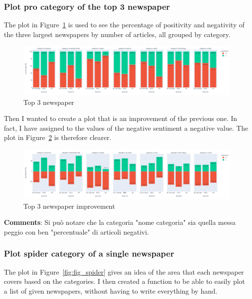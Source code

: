 \subsubsection{Plot pro category of the top 3 newspaper}
The plot in Figure~\ref{fig:fig_top3} is used to see the percentage of positivity and negativity of the three largest newspapers by number of articles, all grouped by category.

\begin{figure}[H]
\centering
\includegraphics[width=1.0\textwidth]{images/cat2.jpg}
\caption{Top 3 newspaper}
\label{fig:fig_top3}
\end{figure}
\FloatBarrier

Then I wanted to create a plot that is an improvement of the previous one. In fact, I have assigned to the values of the negative sentiment a negative value.
The plot in Figure~\ref{fig:fig_improvement} is therefore clearer.

\begin{figure}[H]
\centering
\includegraphics[width=1.0\textwidth]{images/cat.jpg}
\caption{Top 3 newspaper improvement}
\label{fig:fig_improvement}
\end{figure}
\FloatBarrier
\textbf{Comments}: Si può notare che la categoria "nome categoria" sia quella messa peggio con ben "percentuale" di articoli negativi.

\subsubsection{Plot spider category of a single newspaper} 
The plot in Figure~\ref{fig:fig_spider} gives an idea of the area that each newspaper covers based on the categories. I then created a function to be able to easily plot a list of given newspapers, without having to write everything by hand.

